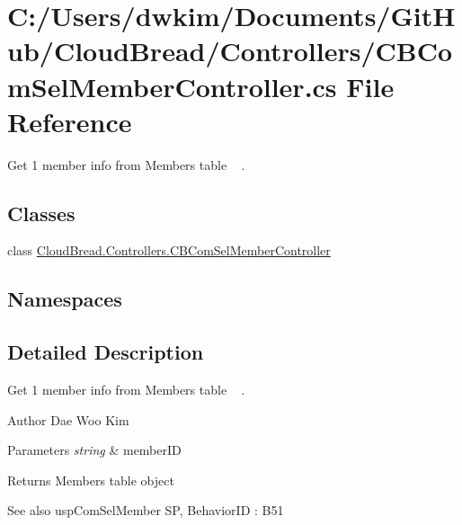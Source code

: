 \hypertarget{a00127}{}\section{C\+:/\+Users/dwkim/\+Documents/\+Git\+Hub/\+Cloud\+Bread/\+Controllers/\+C\+B\+Com\+Sel\+Member\+Controller.cs File Reference}
\label{a00127}


Get 1 member info from Members table ~\newline
.  


\subsection*{Classes}
\begin{DoxyCompactItemize}
\item 
class \hyperlink{a00016}{Cloud\+Bread.\+Controllers.\+C\+B\+Com\+Sel\+Member\+Controller}
\end{DoxyCompactItemize}
\subsection*{Namespaces}
\begin{DoxyCompactItemize}
\end{DoxyCompactItemize}


\subsection{Detailed Description}
Get 1 member info from Members table ~\newline
. 

\begin{DoxyAuthor}{Author}
Dae Woo Kim 
\end{DoxyAuthor}

\begin{DoxyParams}{Parameters}
{\em string} & member\+ID \\
\hline
\end{DoxyParams}
\begin{DoxyReturn}{Returns}
Members table object 
\end{DoxyReturn}
\begin{DoxySeeAlso}{See also}
usp\+Com\+Sel\+Member SP, Behavior\+ID \+: B51 
\end{DoxySeeAlso}
